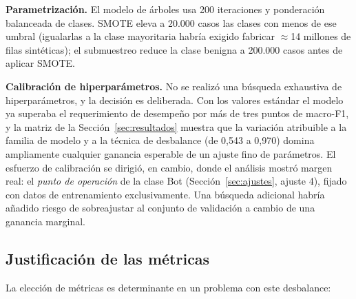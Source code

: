\documentclass[11pt,a4paper]{article}
\begin{document}
\noindent\textbf{Parametrización.} El modelo de árboles usa 200 iteraciones y
ponderación balanceada de clases. SMOTE eleva a 20.000 casos las clases con
menos de ese umbral (igualarlas a la clase mayoritaria habría exigido
fabricar $\approx$14 millones de filas sintéticas); el submuestreo reduce la
clase benigna a 200.000 casos antes de aplicar SMOTE.

\noindent\textbf{Calibración de hiperparámetros.} No se realizó una búsqueda
exhaustiva de hiperparámetros, y la decisión es deliberada. Con los valores
estándar el modelo ya superaba el requerimiento de desempeño por más de tres
puntos de macro-F1, y la matriz de la Sección~\ref{sec:resultados} muestra
que la variación atribuible a la familia de modelo y a la técnica de
desbalance (de 0,543 a 0,970) domina ampliamente cualquier ganancia esperable
de un ajuste fino de parámetros. El esfuerzo de calibración se dirigió, en
cambio, donde el análisis mostró margen real: el \emph{punto de operación} de
la clase Bot (Sección~\ref{sec:ajustes}, ajuste 4), fijado con datos de
entrenamiento exclusivamente. Una búsqueda adicional habría añadido riesgo de
sobreajustar al conjunto de validación a cambio de una ganancia marginal.

\subsection{Justificación de las métricas}

La elección de métricas es determinante en un problema con este desbalance:
\end{document}
